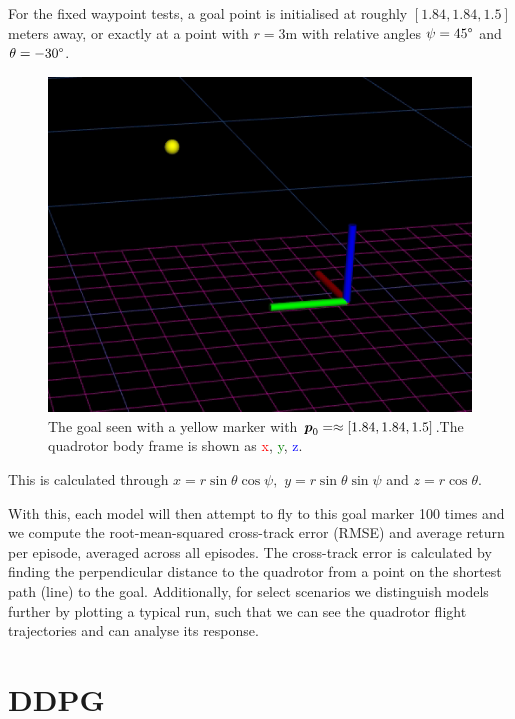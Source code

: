 For the fixed waypoint tests, a goal point is initialised at roughly $[1.84, 1.84, 1.5]$ meters away, or exactly at a point with $r=3$m with relative angles $\psi=45\degree$ and $\theta = -30\degree$. 
\begin{figure}[hbt]
    \centering
    \includegraphics[scale=0.8]{figures/5_/5_waypoint.png}
    \caption{The goal seen with a yellow marker with ${\boldsymbol{p}}_0 = \approx [1.84, 1.84, 1.5]$.The quadrotor body frame is shown as \textcolor{red}{x}, \textcolor{green}{y}, \textcolor{blue}{z}.}
    \label{fig:5_waypoint}
\end{figure}
This is calculated through $x = r \sin{\theta}  \cos{\psi}, \,\,y = r \sin{\theta}  \sin{\psi}$ and $z = r \cos{\theta}$.

With this, each model will then attempt to fly to this goal marker 100 times and we compute the root-mean-squared cross-track error (RMSE) and average return per episode, averaged across all episodes. The cross-track error is calculated by finding the perpendicular distance to the quadrotor from a point on the shortest path (line) to the goal.
Additionally, for select scenarios we distinguish models further by plotting a typical run, such that we can see the quadrotor flight trajectories and can analyse its response.

\section{DDPG}
\label{sec:5_DDPG}

